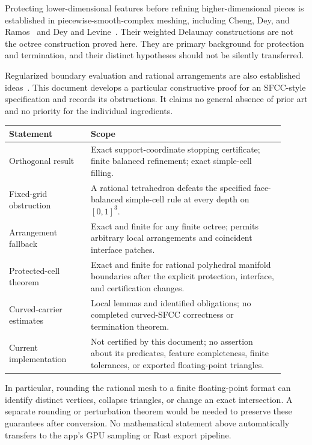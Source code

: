 \documentclass[11pt]{article}
\theoremstyle{definition}
\theoremstyle{remark}
\begin{document}
Protecting lower-dimensional features before refining higher-dimensional
pieces is established in piecewise-smooth-complex meshing, including
Cheng, Dey, and Ramos~\cite{psc} and Dey and Levine~\cite{dey-levine}.
Their weighted Delaunay constructions are not the octree construction
proved here. They are primary background for protection and termination,
and their distinct hypotheses should not be silently transferred.

Regularized boundary evaluation and rational arrangements are also
established ideas~\cite{cgal-nef}. This document develops a particular
constructive proof for an SFCC-style specification and records its
obstructions. It claims no general absence of prior art and no priority
for the individual ingredients.

\begin{center}
\begin{tabular}{>{\raggedright\arraybackslash}p{0.27\linewidth}
                >{\raggedright\arraybackslash}p{0.64\linewidth}}
\toprule
Statement & Scope\\
\midrule
Orthogonal result & Exact support-coordinate stopping certificate;
  finite balanced refinement; exact simple-cell filling.\\[3pt]
Fixed-grid obstruction & A rational tetrahedron defeats the specified
  face-balanced simple-cell rule at every depth on $[0,1]^3$.\\[3pt]
Arrangement fallback & Exact and finite for any finite octree; permits
  arbitrary local arrangements and coincident interface patches.\\[3pt]
Protected-cell theorem & Exact and finite for rational polyhedral
  manifold boundaries after the explicit protection, interface,
  and certification changes.\\[3pt]
Curved-carrier estimates & Local lemmas and identified obligations;
  no completed curved-SFCC correctness or termination theorem.\\[3pt]
Current implementation & Not certified by this document; no assertion
  about its predicates, feature completeness, finite tolerances,
  or exported floating-point triangles.\\
\bottomrule
\end{tabular}
\end{center}

In particular, rounding the rational mesh to a finite floating-point
format can identify distinct vertices, collapse triangles, or change
an exact intersection. A separate rounding or perturbation theorem
would be needed to preserve these guarantees after conversion.
No mathematical statement above automatically transfers to the app's
GPU sampling or Rust export pipeline.
\end{document}
